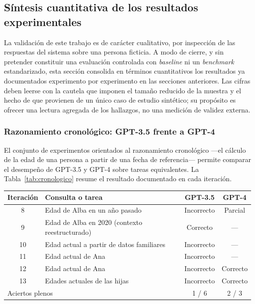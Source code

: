 \subsection{Síntesis cuantitativa de los resultados experimentales}

La validación de este trabajo es de carácter cualitativo, por inspección de las respuestas del sistema sobre una persona ficticia. A modo de cierre, y sin pretender constituir una evaluación controlada con \textit{baseline} ni un \textit{benchmark} estandarizado, esta sección consolida en términos cuantitativos los resultados ya documentados experimento por experimento en las secciones anteriores. Las cifras deben leerse con la cautela que imponen el tamaño reducido de la muestra y el hecho de que provienen de un único caso de estudio sintético; su propósito es ofrecer una lectura agregada de los hallazgos, no una medición de validez externa.

\subsubsection{Razonamiento cronológico: GPT-3.5 frente a GPT-4}

El conjunto de experimentos orientados al razonamiento cronológico —el cálculo de la edad de una persona a partir de una fecha de referencia— permite comparar el desempeño de GPT-3.5 y GPT-4 sobre tareas equivalentes. La Tabla~\ref{tab:cronologico} resume el resultado documentado en cada iteración.

\begin{center}
\label{tab:cronologico}
\footnotesize
\begin{tabular}{clcc}
\toprule
Iteración & Consulta o tarea & GPT-3.5 & GPT-4 \\
\midrule
8  & Edad de Alba en un año pasado                       & Incorrecto & Parcial \\
9  & Edad de Alba en 2020 (contexto reestructurado)      & Correcto   & --- \\
10 & Edad actual a partir de datos familiares            & Incorrecto & --- \\
11 & Edad actual de Ana                                  & Incorrecto & --- \\
12 & Edad actual de Ana                                  & Incorrecto & Correcto \\
13 & Edades actuales de las hijas                         & Incorrecto & Correcto \\
\midrule
\multicolumn{2}{l}{Aciertos plenos} & 1 / 6 & 2 / 3 \\
\bottomrule
\end{tabular}
\end{center}

